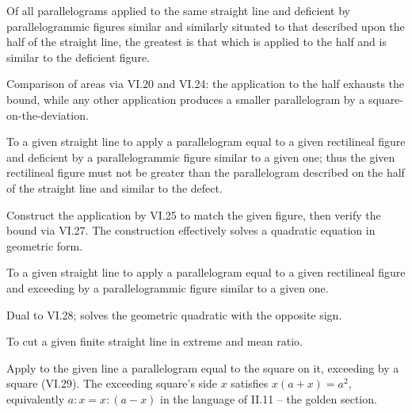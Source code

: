\begin{claim}
\label{prop:VI.27}
Of all parallelograms applied to the same straight line and deficient
by parallelogrammic figures similar and similarly situated to that
described upon the half of the straight line, the greatest is that
which is applied to the half and is similar to the deficient figure.
\end{claim}
\begin{evidence}[Proof of VI.27]
\label{ev:VI.27}
Comparison of areas via VI.20 and VI.24: the application to the half
exhausts the bound, while any other application produces a smaller
parallelogram by a square-on-the-deviation.
\end{evidence}

\begin{claim}
\label{prop:VI.28}
To a given straight line to apply a parallelogram equal to a given
rectilineal figure and deficient by a parallelogrammic figure similar
to a given one; thus the given rectilineal figure must not be greater
than the parallelogram described on the half of the straight line and
similar to the defect.
\end{claim}
\begin{evidence}[Proof of VI.28]
\label{ev:VI.28}
Construct the application by VI.25 to match the given figure, then
verify the bound via VI.27.  The construction effectively solves a
quadratic equation in geometric form.
\end{evidence}

\begin{claim}
\label{prop:VI.29}
To a given straight line to apply a parallelogram equal to a given
rectilineal figure and exceeding by a parallelogrammic figure similar
to a given one.
\end{claim}
\begin{evidence}[Proof of VI.29]
\label{ev:VI.29}
Dual to VI.28; solves the geometric quadratic with the opposite sign.
\end{evidence}

\begin{claim}
\label{prop:VI.30}
To cut a given finite straight line in extreme and mean ratio.
\end{claim}
\begin{evidence}[Proof of VI.30]
\label{ev:VI.30}
Apply to the given line a parallelogram equal to the square on it,
exceeding by a square (VI.29).  The exceeding square's side $x$
satisfies $x(a+x) = a^2$, equivalently $a : x = x : (a - x)$ in the
language of II.11 -- the golden section.
\end{evidence}

